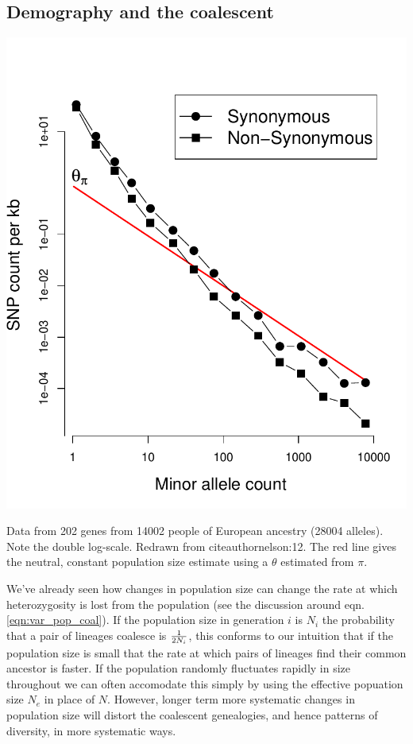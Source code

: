 \subsection{Demography and the coalescent}

\begin{marginfigure}
\begin{center}
  \includegraphics[width = \textwidth]{Journal_figs/genetic_drift/human_pop_growth/Nelson_pop_growth.pdf}
\end{center}
\caption{Data from 202 genes from 14002 people of European ancestry (28004 alleles). Note
  the double log-scale. Redrawn from citeauthor{nelson:12}. The red
  line gives the neutral, constant population size estimate using a
  $\theta$ estimated from $\pi$.} \label{fig:Human_growth}
\end{marginfigure}
We've already seen how changes in population size can change the rate
at which heterozygosity is lost from the population (see the
discussion around eqn. \eqref{eqn:var_pop_coal}). If the population
size in generation $i$ is $N_i$ the probability that a pair of
lineages coalesce is $\nicefrac{1}{2N_i}$, this conforms to our
intuition that if the population size is small that the rate at which
pairs of lineages find their common ancestor is faster. If the
population randomly fluctuates rapidly in size throughout 
we can often accomodate this simply by using the effective popuation size $N_e$ in place of $N$. However,
longer term more systematic changes in population size will distort
the coalescent genealogies, and hence patterns of diversity, in more
systematic ways. 

